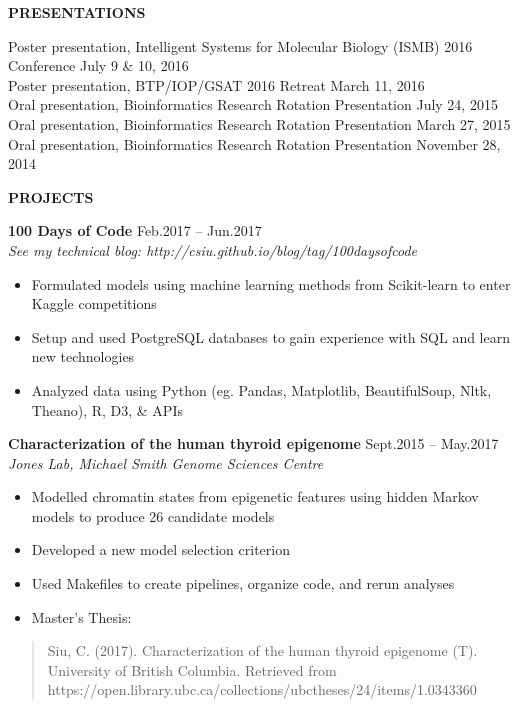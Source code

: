 \documentclass{res}
\renewcommand{\section}[1]{%
  \vspace{0.3in}%
  \centerline{\uppercase{\bf{#1}}}%
  \vspace{-6pt}}
\newcommand{\linepresentation}[3]{%
  #3 \hfill #1\\[.75ex]}
\newcommand{\linehead}[2]{%
  {\bf #1} \hfill #2\\}
\newcommand{\linetitle}[1]{%
  {\sl #1}}
\begin{document}
\begin{resume}
\section{Presentations}

\linepresentation{July 9 \& 10, 2016}{%
  Bioinformatic characterization of the normal thyroid reference epigenome}{%
  Poster presentation, Intelligent Systems for Molecular Biology (ISMB) 2016 Conference}
\linepresentation{March 11, 2016}{%
  Characterization of the normal reference thyroid epigenome}{%
  Poster presentation, BTP/IOP/GSAT 2016 Retreat}
\linepresentation{July 24, 2015}{%
  Literature-based knowledge discovery of Biomedical Text}{%
  Oral presentation, Bioinformatics Research Rotation Presentation}
\linepresentation{March 27, 2015}{%
  miRNA promoter recognition with CAGE and sRNA-seq}{%
  Oral presentation, Bioinformatics Research Rotation Presentation}
\linepresentation{November 28, 2014}{%
  Primer Data Extraction and Blast API}{%
  Oral presentation, Bioinformatics Research Rotation Presentation}
\vspace{-1.5em}

\section{Projects}
\linehead{100 Days of Code}{Feb.2017 -- Jun.2017}
\linetitle{See my technical blog: http://csiu.github.io/blog/tag/100daysofcode}
\begin{itemize}
  \item Formulated models using machine learning methods from Scikit-learn to enter Kaggle competitions
  \item Setup and used PostgreSQL databases to gain experience with SQL and learn new technologies
  \item Analyzed data using Python (eg. Pandas, Matplotlib, BeautifulSoup, Nltk, Theano), R, D3, \& APIs
\end{itemize}

\linehead{Characterization of the human thyroid epigenome}{Sept.2015 -- May.2017}
\linetitle{Jones Lab, Michael Smith Genome Sciences Centre}
\begin{itemize}
  \item Modelled chromatin states from epigenetic features using hidden Markov models to produce 26 candidate models
  \item Developed a new model selection criterion
  \item Used Makefiles to create pipelines, organize code, and rerun analyses
  \item Master's Thesis:
\end{itemize}
\begin{quotation}
  Siu, C. (2017). Characterization of the human thyroid epigenome (T). University of British Columbia. Retrieved from https://open.library.ubc.ca/collections/ubctheses/24/items/1.0343360
\end{quotation}


\end{resume}
\end{document}
